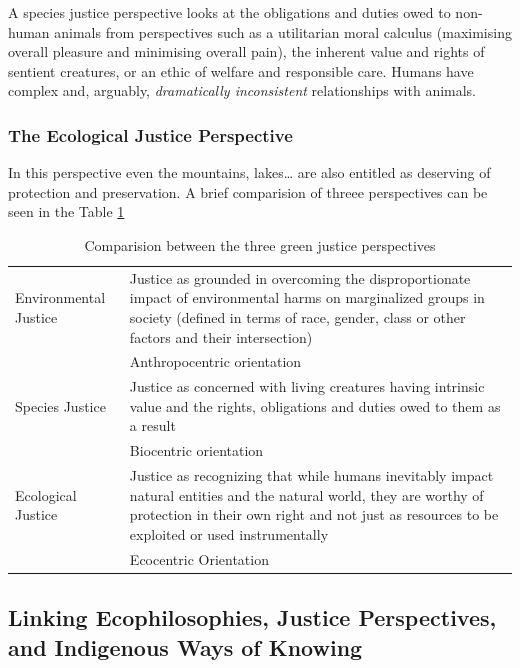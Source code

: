 \documentclass{article}
\begin{document}
A species justice perspective looks at the obligations and duties owed to non-human animals from perspectives such as a utilitarian moral calculus (maximising overall pleasure and minimising overall pain), the inherent value and rights of sentient creatures, or an ethic of welfare and responsible care. Humans have complex and, arguably, \textit{dramatically inconsistent} relationships with animals.

\subsubsection*{The Ecological Justice Perspective}

In this perspective even the mountains, lakes… are also entitled as deserving of protection and preservation. A brief comparision of threee perspectives can be seen in the Table \ref{three_perspective}

\begin{table}
    \centering
    \begin{tabular}{|p{2.5 cm}|p{12.5 cm}|}
        \hline
        Environmental Justice &  Justice as grounded in overcoming the disproportionate impact of environmental harms on marginalized groups in society (defined in terms of race, gender, class or other factors and their intersection)\\
        & Anthropocentric orientation \\
        \hline
        Species Justice & Justice as concerned with living creatures having intrinsic value and the rights, obligations and duties owed to them as a result \\
        & Biocentric orientation \\
        \hline
        Ecological Justice & Justice as recognizing that while humans inevitably impact natural entities and the natural world, they are worthy of protection in their own right and not just as resources to be exploited or used instrumentally \\
        & Ecocentric Orientation \\
        \hline
    \end{tabular}
    \caption{Comparision between the three green justice perspectives}
    \label{three_perspective}
\end{table}

\subsection{Linking Ecophilosophies, Justice Perspectives, and Indigenous Ways of Knowing}
\end{document}
